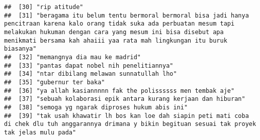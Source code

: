 \documentclass[
]{article}
\begin{document}
\begin{verbatim}
##  [30] "rip atitude"                                                                                                                                                                                                                                                                       
##  [31] "beragama itu belum tentu bermoral bermoral bisa jadi hanya pencitraan karena kalo orang tidak suka ada perbuatan mesum tapi melakukan hukuman dengan cara yang mesum ini bisa disebut apa menikmati bersama kah ahaiii yaa rata mah lingkungan itu buruk biasanya"                 
##  [32] "memangnya dia mau ke madrid"                                                                                                                                                                                                                                                       
##  [33] "pantas dapat nobel nih penelitiannya"                                                                                                                                                                                                                                              
##  [34] "ntar dibilang melawan sunnatullah lho"                                                                                                                                                                                                                                             
##  [35] "gubernur ter baka"                                                                                                                                                                                                                                                                 
##  [36] "ya allah kasiannnnn fak the polissssss men tembak aje"                                                                                                                                                                                                                             
##  [37] "sebuah kolaborasi epik antara kurang kerjaan dan hiburan"                                                                                                                                                                                                                          
##  [38] "semoga yg ngarak diproses hukum abis ini"                                                                                                                                                                                                                                          
##  [39] "tak usah khawatir lh bos kan loe dah siapin peti mati coba di chek dlu tuh anggarannya drimana y bikin begituan sesuai tak proyek tak jelas mulu pada"                                                                                                                             

\end{verbatim}
\end{document}
